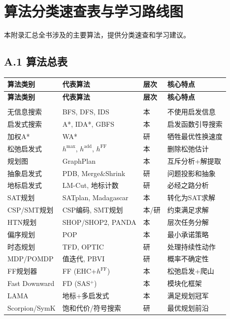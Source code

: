 \chapter{算法分类速查表与学习路线图}

本附录汇总全书涉及的主要算法，提供分类速查和学习建议。

\section*{A.1 算法总表}

\begin{longtable}{p{3.5cm}p{4cm}p{1.2cm}p{4.5cm}}
\toprule
\textbf{算法类别} & \textbf{代表算法} & \textbf{层次} & \textbf{核心特点} \\
\midrule
\endfirsthead
\toprule
\textbf{算法类别} & \textbf{代表算法} & \textbf{层次} & \textbf{核心特点} \\
\midrule
\endhead
\bottomrule
\endfoot

\multicolumn{4}{l}{\textbf{第一篇：经典规划方法}} \\
\midrule
无信息搜索 & BFS, DFS, IDS & \textcolor{ugcolor}{本} & 不使用启发信息 \\
启发式搜索 & A*, IDA*, GBFS & \textcolor{ugcolor}{本} & 启发函数引导搜索 \\
加权A* & WA* & \textcolor{gradcolor}{研} & 牺牲最优性换速度 \\
松弛启发式 & $h^{\max}$, $h^{\mathrm{add}}$, $h^{\mathrm{FF}}$ & \textcolor{ugcolor}{本} & 删除松弛估计 \\
规划图 & GraphPlan & \textcolor{ugcolor}{本} & 互斥分析+解提取 \\
抽象启发式 & PDB, Merge\&Shrink & \textcolor{gradcolor}{研} & 问题投影和抽象 \\
地标启发式 & LM-Cut, 地标计数 & \textcolor{gradcolor}{研} & 必经之路分析 \\
SAT规划 & SATplan, Madagascar & \textcolor{ugcolor}{本} & 转化为SAT求解 \\
CSP/SMT规划 & CSP编码, SMT规划 & \textcolor{ugcolor}{本}/\textcolor{gradcolor}{研} & 约束满足求解 \\
HTN规划 & SHOP/SHOP2, PANDA & \textcolor{ugcolor}{本} & 层次任务分解 \\
偏序规划 & POP & \textcolor{ugcolor}{本} & 最小承诺策略 \\
时态规划 & TFD, OPTIC & \textcolor{gradcolor}{研} & 处理持续性动作 \\
MDP/POMDP & 值迭代, PBVI & \textcolor{gradcolor}{研} & 概率不确定性 \\
FF规划器 & FF (EHC+$h^{\mathrm{FF}}$) & \textcolor{ugcolor}{本} & 松弛启发+爬山 \\
Fast Downward & FD (SAS$^+$) & \textcolor{ugcolor}{本} & 模块化框架 \\
LAMA & 地标+多启发式 & \textcolor{ugcolor}{本} & 满足规划冠军 \\
Scorpion/SymK & 饱和代价/符号搜索 & \textcolor{gradcolor}{研} & 最优规划前沿 \\
\midrule


\end{longtable}
